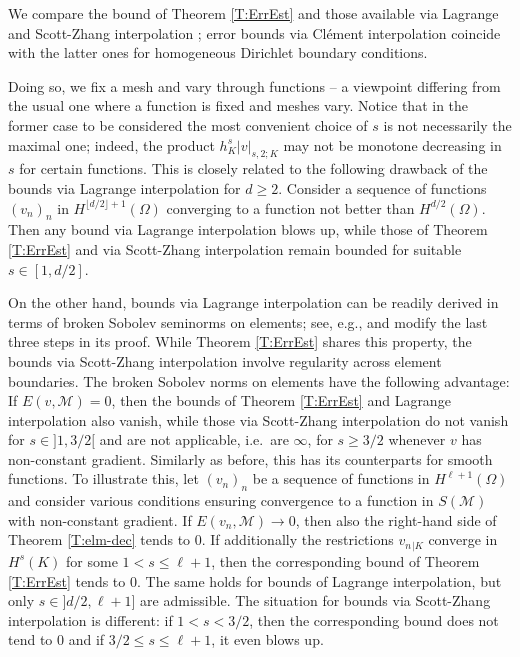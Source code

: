 \documentclass[a4paper]{amsart}
\numberwithin{equation}{section}
\theoremstyle{plain}
\theoremstyle{definition}
\begin{document}
We compare the bound of Theorem \ref{T:ErrEst} and those available via 
Lagrange and Scott-Zhang interpolation \cite[\S4]{Scott.Zhang:90}; error bounds 
via Cl\'ement interpolation \cite{Clement:75} coincide with the latter ones for 
homogeneous Dirichlet boundary conditions.

Doing so, we fix a mesh and vary through functions -- a viewpoint differing 
from the usual one where a function is fixed and meshes vary.  Notice that in 
the former case to be considered the most convenient choice of $s$ is not 
necessarily the maximal one; indeed, the product $h_{K}^s 
{{\left|{{v}}\right|_{{{s},{2};{K}}}}}$ may not be monotone decreasing in $s$ for certain 
functions. This is closely related to the following drawback of the bounds via 
Lagrange interpolation for $d\geq2$.  Consider a sequence of functions 
$(v_n)_n$ in ${H^{{\lfloor d/2 \rfloor +1}}}(\Omega)$ converging to a function not 
better than ${H^{{d/2}}}(\Omega)$.  Then any bound via Lagrange interpolation 
blows up, while those of Theorem \ref{T:ErrEst} and via Scott-Zhang 
interpolation remain bounded for suitable $s\in{[{1},{{d/2}}]}$.

On the other hand, bounds via Lagrange interpolation can be readily derived 
in terms of broken Sobolev seminorms on elements; see, e.g., 
\cite[(4.4.20)]{Brenner.Scott:08} and modify the last three steps in its 
proof.  While Theorem \ref{T:ErrEst} shares this property, the bounds via 
Scott-Zhang interpolation \cite{Scott.Zhang:90} involve regularity across 
element boundaries.  The broken Sobolev norms on elements have the following 
advantage: If $E(v,{\mathcal{M}})=0$, then the bounds of Theorem \ref{T:ErrEst} and 
Lagrange interpolation also vanish, while those via Scott-Zhang interpolation 
\cite{Scott.Zhang:90} do not vanish for $s\in{{]}1,{3/2}{[}}$ and are not 
applicable, i.e.\ are $\infty$, for $s\geq3/2$ whenever $v$ has non-constant 
gradient. Similarly as before, this has its counterparts for smooth functions.  
To illustrate this, let $(v_n)_n$ be a sequence of functions in 
${H^{{{\ell}+1}}}(\Omega)$ and consider various conditions ensuring convergence to 
a function in ${S}({\mathcal{M}})$ with non-constant gradient.  If  $E(v_n,{\mathcal{M}}) 
\to 0$, then also the right-hand side of Theorem \ref{T:elm-dec} tends to $0$.  
If additionally the restrictions $v_n{}_{|{K}}$ converge in ${H^{{s}}}({K})$ 
for some $1 < s \leq {\ell}+1$, then the corresponding bound of Theorem 
\ref{T:ErrEst} tends to $0$.  The same holds for bounds of Lagrange 
interpolation, but only $s\in{{]{{d/2}}},{{{\ell}+1}]}}$ are admissible.  The 
situation for bounds via Scott-Zhang interpolation is different: if $1<s<3/2$, 
then the corresponding bound does not tend to $0$ and if $3/2\leq s \leq 
{\ell}+1$, it even blows up.
\end{document}

